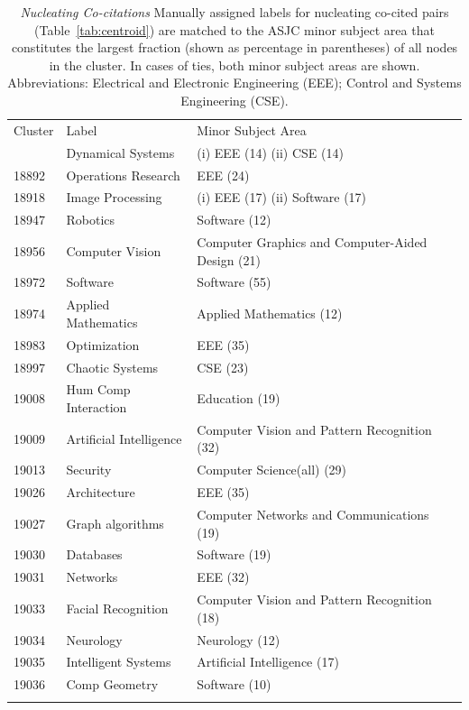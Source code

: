 \begin{table}[ht]
\caption{\emph{Nucleating Co-citations} Manually assigned labels for nucleating co-cited pairs (Table~\ref{tab:centroid}) are matched to the ASJC minor subject area that constitutes the largest fraction (shown as percentage in parentheses) of all nodes in the cluster. In cases of ties, both minor subject areas are shown. Abbreviations: Electrical and Electronic Engineering (EEE); Control and Systems Engineering (CSE).}
\label{tab:centroid_reconcile}       
\begin{tabular}{p{8 mm}p{42 mm}l}
\hline\noalign{\smallskip}
Cluster & Label & Minor Subject Area \\
\noalign{\smallskip}\hline
18670 & Dynamical Systems & (i) EEE (14) (ii) CSE (14) \\
18892 & Operations Research & EEE (24) \\ 
18918 & Image Processing & (i) EEE (17) (ii) Software (17) \\ 
18947 & Robotics & Software (12) \\ 
18956 & Computer Vision & Computer Graphics and Computer-Aided Design (21)\\ 
18972 & Software & Software (55) \\ 
18974 & Applied Mathematics & Applied Mathematics (12)\\ 
18983 & Optimization & EEE (35) \\ 
18997 & Chaotic Systems & CSE (23)\\ 
19008 & Hum Comp Interaction & Education (19)\\ 
19009 & Artificial Intelligence & Computer Vision and Pattern Recognition (32)\\ 
19013 & Security & Computer Science(all) (29)\\ 
19026 & Architecture & EEE (35) \\ 
19027 & Graph algorithms & Computer Networks and Communications (19)\\ 
19030 & Databases & Software (19)\\ 
19031 & Networks & EEE (32)\\ 
19033 & Facial Recognition & Computer Vision and Pattern Recognition (18)\\ 
19034 & Neurology & Neurology (12)\\ 
19035 & Intelligent Systems & Artificial Intelligence (17)\\ 
19036 & Comp Geometry & Software (10)\\ 
\noalign{\smallskip}\hline
\end{tabular}
\end{table}
\newpage

